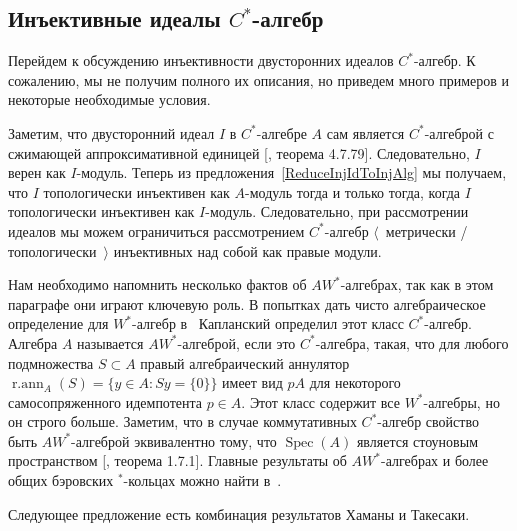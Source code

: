 
\subsection{Инъективные идеалы 
    \texorpdfstring{$C^*$}{C*}-алгебр}\label{
        SubSectionInjectiveIdealsOfCStarAlgebras}

Перейдем к обсуждению инъективности двусторонних идеалов $C^*$-алгебр. К
сожалению, мы не получим полного их описания, но приведем много примеров и
некоторые необходимые условия. 

Заметим, что двусторонний идеал $I$ в $C^*$-алгебре $A$ сам является
$C^*$-алгеброй с сжимающей аппроксимативной единицей [\cite{HelBanLocConvAlg},
теорема 4.7.79]. Следовательно, $I$ верен как $I$-модуль. Теперь из
предложения~\ref{ReduceInjIdToInjAlg} мы получаем, что $I$ топологически
инъективен как $A$-модуль тогда и только тогда, когда $I$ топологически
инъективен как $I$-модуль. Следовательно, при рассмотрении идеалов мы можем
ограничиться рассмотрением $C^*$-алгебр $\langle$~метрически /
топологически~$\rangle$ инъективных над собой как правые модули.

Нам необходимо напомнить несколько фактов об $AW^*$-алгебрах, так как в этом
параграфе они играют ключевую роль. В попытках дать чисто алгебраическое
определение для $W^*$-алгебр в~\cite{KaplProjInBanAlg} Капланский определил этот
класс $C^*$-алгебр. Алгебра $A$ называется $AW^*$-алгеброй, если это
$C^*$-алгебра, такая, что для любого подмножества $S\subset A$ правый
алгебраический аннулятор $\operatorname{r.ann}_A(S)= \{y\in A: Sy= \{0 \} \}$
имеет вид $pA$ для некоторого самосопряженного идемпотента $p\in A$. Этот класс
содержит все $W^*$-алгебры, но он строго больше. Заметим, что в случае
коммутативных $C^*$-алгебр свойство быть $AW^*$-алгеброй эквивалентно тому, что
$\operatorname{Spec}(A)$ является стоуновым пространством
[\cite{BerbBaerStarRings}, теорема 1.7.1]. Главные результаты об $AW^*$-алгебрах
и более общих бэровских ${}^*$-кольцах можно найти в~\cite{BerbBaerStarRings}. 

Следующее предложение есть комбинация результатов Хаманы и Такесаки.

